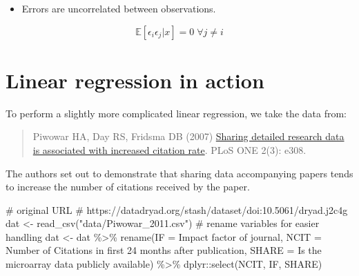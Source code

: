 \documentclass[
  letterpaper,
  DIV=11,
  numbers=noendperiod]{scrreprt}
\newenvironment{Shaded}{\begin{snugshade}}{\end{snugshade}}
\newcommand{\AttributeTok}[1]{\textcolor[rgb]{0.40,0.45,0.13}{#1}}
\newcommand{\CommentTok}[1]{\textcolor[rgb]{0.37,0.37,0.37}{#1}}
\newcommand{\FunctionTok}[1]{\textcolor[rgb]{0.28,0.35,0.67}{#1}}
\newcommand{\NormalTok}[1]{\textcolor[rgb]{0.00,0.23,0.31}{#1}}
\newcommand{\OtherTok}[1]{\textcolor[rgb]{0.00,0.23,0.31}{#1}}
\newcommand{\SpecialCharTok}[1]{\textcolor[rgb]{0.37,0.37,0.37}{#1}}
\newcommand{\StringTok}[1]{\textcolor[rgb]{0.13,0.47,0.30}{#1}}
\providecommand{\tightlist}{%
  \setlength{\itemsep}{0pt}\setlength{\parskip}{0pt}}\usepackage{longtable,booktabs,array}
\begin{document}
\begin{itemize}
\tightlist
\item
  Errors are uncorrelated between observations.
\end{itemize}

\[
\mathbb E[\epsilon_i \epsilon_j | x] = 0 \; \forall j \neq i
\]

\hypertarget{linear-regression-in-action}{%
\section{Linear regression in
action}\label{linear-regression-in-action}}

To perform a slightly more complicated linear regression, we take the
data from:

\begin{quote}
Piwowar HA, Day RS, Fridsma DB (2007)
\href{https://doi.org/10.1371/journal.pone.0000308}{Sharing detailed
research data is associated with increased citation rate}. PLoS ONE
2(3): e308.
\end{quote}

The authors set out to demonstrate that sharing data accompanying papers
tends to increase the number of citations received by the paper.

\begin{Shaded}
\begin{Highlighting}[]
\CommentTok{\# original URL }
\CommentTok{\# https://datadryad.org/stash/dataset/doi:10.5061/dryad.j2c4g}
\NormalTok{dat }\OtherTok{\textless{}{-}} \FunctionTok{read\_csv}\NormalTok{(}\StringTok{"data/Piwowar\_2011.csv"}\NormalTok{) }
\CommentTok{\# rename variables for easier handling}
\NormalTok{dat }\OtherTok{\textless{}{-}}\NormalTok{ dat }\SpecialCharTok{\%\textgreater{}\%} \FunctionTok{rename}\NormalTok{(}\AttributeTok{IF =} \StringTok{\textasciigrave{}}\AttributeTok{Impact factor of journal}\StringTok{\textasciigrave{}}\NormalTok{, }
                      \AttributeTok{NCIT =} \StringTok{\textasciigrave{}}\AttributeTok{Number of Citations in first 24 months after publication}\StringTok{\textasciigrave{}}\NormalTok{, }
                      \AttributeTok{SHARE =} \StringTok{\textasciigrave{}}\AttributeTok{Is the microarray data publicly available}\StringTok{\textasciigrave{}}\NormalTok{) }\SpecialCharTok{\%\textgreater{}\%} 
\NormalTok{      dplyr}\SpecialCharTok{::}\FunctionTok{select}\NormalTok{(NCIT, IF, SHARE)}
\end{Highlighting}
\end{Shaded}
\end{document}
